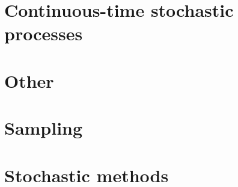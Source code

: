 \documentclass[oneside]{book}
\begin{document}
\part{Continuous-time stochastic processes}



\part{Other}


\part{Sampling}




\part{Stochastic methods}




\end{document}
